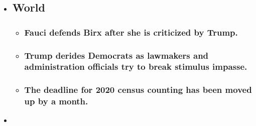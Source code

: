 \begin{itemize}
\item
  \href{https://www.nytimes3xbfgragh.onion/2020/08/03/world/coronavirus-covid-19.html?type=styln-live-updates\&label=world\&index=0}{}

  \hypertarget{world}{%
  \subsection{World}\label{world}}

  \begin{itemize}
  \item
    \href{https://www.nytimes3xbfgragh.onion/2020/08/03/world/coronavirus-covid-19.html?type=styln-live-updates\&label=world\&index=0\#link-4547638f}{}

    \hypertarget{fauci-defends-birx-after-she-is-criticized-by-trump}{%
    \subsubsection{Fauci defends Birx after she is criticized by
    Trump.}\label{fauci-defends-birx-after-she-is-criticized-by-trump}}
  \item
    \href{https://www.nytimes3xbfgragh.onion/2020/08/03/world/coronavirus-covid-19.html?type=styln-live-updates\&label=world\&index=0\#link-15e7f995}{}

    \hypertarget{trump-derides-democrats-as-lawmakers-and-administration-officials-try-to-break-stimulus-impasse}{%
    \subsubsection{Trump derides Democrats as lawmakers and
    administration officials try to break stimulus
    impasse.}\label{trump-derides-democrats-as-lawmakers-and-administration-officials-try-to-break-stimulus-impasse}}
  \item
    \href{https://www.nytimes3xbfgragh.onion/2020/08/03/world/coronavirus-covid-19.html?type=styln-live-updates\&label=world\&index=0\#link-e5a2cda}{}

    \hypertarget{the-deadline-for-2020-census-counting-has-been-moved-up-by-a-month}{%
    \subsubsection{The deadline for 2020 census counting has been moved
    up by a
    month.}\label{the-deadline-for-2020-census-counting-has-been-moved-up-by-a-month}}
  \end{itemize}
\item
  \href{https://www.nytimes3xbfgragh.onion/live/2020/08/03/business/stock-market-today-coronavirus?type=styln-live-updates\&label=business\&index=1}{}


\end{itemize}
